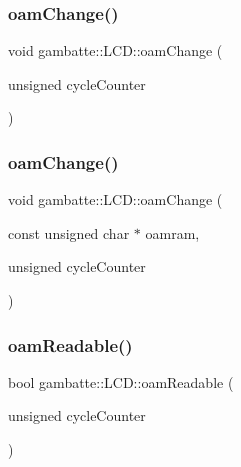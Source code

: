 \mbox{\label{classgambatte_1_1LCD_a176a351682dbee928b2cbcd29236e2d2}} 
\subsubsection{\texorpdfstring{oam\+Change()}{oamChange()}\hspace{0.1cm}{\footnotesize\ttfamily [1/2]}}
{\footnotesize\ttfamily void gambatte\+::\+L\+C\+D\+::oam\+Change (\begin{DoxyParamCaption}\item[{unsigned}]{cycle\+Counter }\end{DoxyParamCaption})}

\mbox{\label{classgambatte_1_1LCD_a2198ab07a1eb038f820141c39c312baa}} 
\subsubsection{\texorpdfstring{oam\+Change()}{oamChange()}\hspace{0.1cm}{\footnotesize\ttfamily [2/2]}}
{\footnotesize\ttfamily void gambatte\+::\+L\+C\+D\+::oam\+Change (\begin{DoxyParamCaption}\item[{const unsigned char $\ast$}]{oamram,  }\item[{unsigned}]{cycle\+Counter }\end{DoxyParamCaption})}

\mbox{\label{classgambatte_1_1LCD_ac85da77238c2253e877f27ba3cc731c0}} 
\subsubsection{\texorpdfstring{oam\+Readable()}{oamReadable()}}
{\footnotesize\ttfamily bool gambatte\+::\+L\+C\+D\+::oam\+Readable (\begin{DoxyParamCaption}\item[{unsigned}]{cycle\+Counter }\end{DoxyParamCaption})}

